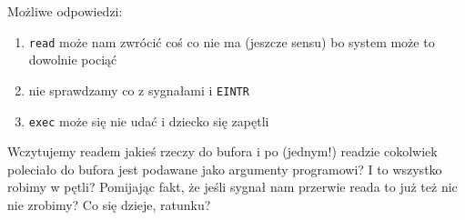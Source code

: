 Możliwe odpowiedzi:
\begin{enumerate}
	\item \texttt{read} może nam zwrócić coś co nie ma (jeszcze sensu) bo system może to dowolnie pociąć
	\item nie sprawdzamy co z sygnałami i \texttt{EINTR}
	\item \texttt{exec} może się nie udać i dziecko się zapętli
\end{enumerate}

Wczytujemy readem jakieś rzeczy do bufora i po (jednym!) readzie cokolwiek poleciało do bufora jest podawane jako argumenty programowi? I to wszystko robimy w pętli? Pomijając fakt, że jeśli sygnał nam przerwie reada to już też nic nie zrobimy? Co się dzieje, ratunku?


